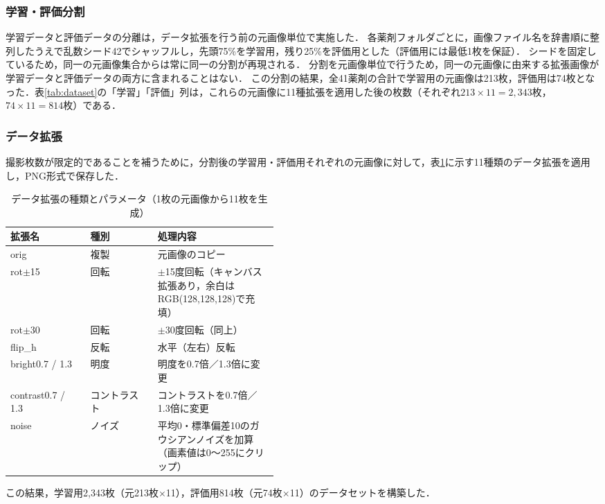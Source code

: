 \documentclass[dvipdfmx]{jsarticle}
\begin{document}
\subsubsection{学習・評価分割}

学習データと評価データの分離は，データ拡張を行う前の元画像単位で実施した．
各薬剤フォルダごとに，画像ファイル名を辞書順に整列したうえで乱数シード42でシャッフルし，先頭75\%を学習用，残り25\%を評価用とした（評価用には最低1枚を保証）．
シードを固定しているため，同一の元画像集合からは常に同一の分割が再現される．
分割を元画像単位で行うため，同一の元画像に由来する拡張画像が学習データと評価データの両方に含まれることはない．
この分割の結果，全41薬剤の合計で学習用の元画像は213枚，評価用は74枚となった．表\ref{tab:dataset}の「学習」「評価」列は，これらの元画像に11種拡張を適用した後の枚数（それぞれ$213\times11=2{,}343$枚，$74\times11=814$枚）である．

\subsubsection{データ拡張}

撮影枚数が限定的であることを補うために，分割後の学習用・評価用それぞれの元画像に対して，表\ref{tab:aug}に示す11種類のデータ拡張を適用し，PNG形式で保存した．

\begin{table}[htbp]
\centering
\caption{データ拡張の種類とパラメータ（1枚の元画像から11枚を生成）}
\label{tab:aug}
\small
\begin{tabular}{llp{0.45\linewidth}}
\hline
拡張名 & 種別 & 処理内容 \\
\hline
orig & 複製 & 元画像のコピー \\
rot$\pm$15 & 回転 & $\pm$15度回転（キャンバス拡張あり，余白はRGB(128,128,128)で充填） \\
rot$\pm$30 & 回転 & $\pm$30度回転（同上） \\
flip\_h & 反転 & 水平（左右）反転 \\
bright0.7 / 1.3 & 明度 & 明度を0.7倍／1.3倍に変更 \\
contrast0.7 / 1.3 & コントラスト & コントラストを0.7倍／1.3倍に変更 \\
noise & ノイズ & 平均0・標準偏差10のガウシアンノイズを加算（画素値は0〜255にクリップ） \\
\hline
\end{tabular}
\end{table}

この結果，学習用2,343枚（元213枚$\times$11），評価用814枚（元74枚$\times$11）のデータセットを構築した．
\end{document}
